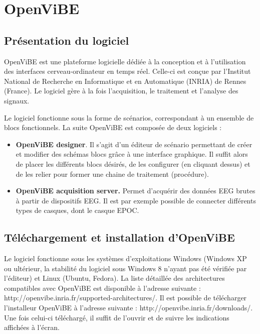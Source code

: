 \newpage
\section*{OpenViBE}

\subsection*{Présentation du logiciel}

OpenViBE est une plateforme logicielle dédiée à la conception et à l'utilisation des interfaces cerveau-ordinateur en temps réel. Celle-ci est conçue par l'Institut National de Recherche en Informatique et en Automatique (INRIA) de Rennes (France). Le logiciel gère à la fois l'acquisition, le traitement et l'analyse des signaux.

Le logiciel fonctionne sous la forme de scénarios, correspondant à un ensemble de blocs fonctionnels. La suite OpenViBE est composée de deux logiciels : 
\begin{itemize}
	\item \textbf{OpenViBE designer}. Il s'agit d'un éditeur de scénario permettant de  créer et modifier des schémas blocs grâce à une interface graphique. Il suffit alors de placer les différents blocs désirés, de les configurer (en cliquant dessus) et de les relier pour former une chaine de traitement (procédure).
	\smallbreak
	\item \textbf{OpenViBE acquisition server.} Permet d'acquérir des données EEG brutes à partir de dispositifs EEG. Il est par exemple possible de connecter différents types de casques, dont le casque EPOC.
	\smallbreak
\end{itemize}

\subsection*{Téléchargement et installation d'OpenViBE}

Le logiciel fonctionne sous les systèmes d'exploitations Windows (Windows XP ou ultérieur, la stabilité du logiciel sous Windows 8 n'ayant pas été vérifiée par l'éditeur) et Linux (Ubuntu, Fedora). La liste détaillée des architectures compatibles avec OpenViBE est disponible à l'adresse suivante : http://openvibe.inria.fr/supported-architectures/.
Il est possible de télécharger l'installeur OpenViBE à l'adresse suivante : http://openvibe.inria.fr/downloads/. Une fois celui-ci téléchargé, il suffit de l'ouvrir et de suivre les indications affichées à l'écran.


